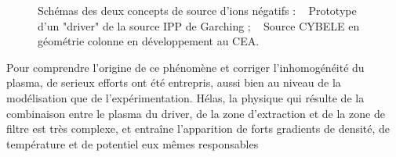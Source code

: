 \begin{refsection}
\begin{figure}[!hbtp]
 \caption{Schémas des deux concepts de source d'ions négatifs :
    ~ Prototype d'un "driver" de la source IPP de Garching
    ; ~ Source CYBELE en géométrie colonne en
    développement au CEA. } 
 \end{figure}

Pour
comprendre l'origine de ce phénomène et corriger l'inhomogénéité du plasma, de
serieux efforts ont été entrepris, aussi bien au niveau de la modélisation que
de l'expérimentation. Hélas, la physique qui résulte de la combinaison entre le
plasma du driver, de la zone d'extraction et de la zone de filtre est très
complexe, et entraîne l'apparition de forts gradients de densité, de température
et de potentiel eux mêmes responsables 



\end{refsection}

